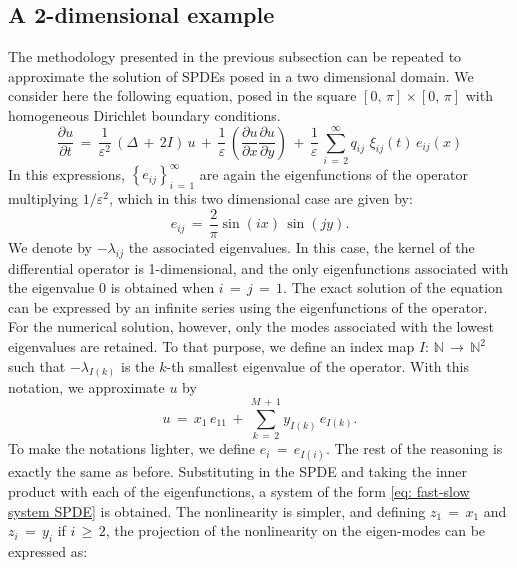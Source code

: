 \subsection{A 2-dimensional example}
\label{sub:numerical_example 2D}
The methodology presented in the previous subsection can be repeated to approximate the solution of SPDEs posed in a two dimensional domain. We consider here the following equation, posed in the square $ [ 0,\,{\pi}]{\times}[ 0,\,{\pi}]$ with homogeneous Dirichlet boundary conditions. 
\begin{equation*}
    \frac{{\partial}u}{{\partial}t} \,=\,\frac{1}{{\varepsilon}^2}\, \left( {\Delta}\,+\,2I\right)\,u \,+\, \frac{1}{\varepsilon} \, \left(\frac{{\partial}u}{{\partial}x}\frac{{\partial}u}{{\partial}y}\right) \, +\, \frac{1}{\varepsilon} \, \sum_{ i\,=\,2}^{ {\infty}}  q_{ij}\,\,{\xi}_{ij}(t)\, e_{ij}(x) 
\end{equation*}
In this expressions, $\left\{e_{ij}\right\}_{i\,=\,1}^{\infty}$ are again the eigenfunctions of the operator multiplying $1/{\varepsilon}^2$, which in this two dimensional case are given by:
\begin{equation*}
    e_{ij} \,=\, \frac{2}{\pi} \sin\left(i x\right) \, \sin\left(j y\right).
\end{equation*}
We denote by $-{\lambda}_{ ij }$ the associated eigenvalues. In this case, the kernel of the differential operator is 1-dimensional, and the only eigenfunctions associated with the eigenvalue 0 is obtained when $i\,=\,j\,=\,1$. The exact solution of the equation can be expressed by an infinite series using the eigenfunctions of the operator. For the numerical solution, however, only the modes associated with the lowest eigenvalues are retained. To that purpose, we define an index map $I: \, \mathbb N\, \to \, \mathbb N^2$ such that $-{\lambda}_{I(k)}$ is the $k$-th smallest eigenvalue of the operator. With this notation, we approximate $u$ by
\begin{equation*}
    u \,=\, x_1\,e_{11} \,+\, \sum_{ k\,=\,2}^{ M\,+\,1} y_{I(k)} \, e_{I(k)}.
\end{equation*}
To make the notations lighter, we define $e_i \,=\, e_{I(i)}$. The rest of the reasoning is exactly the same as before. Substituting in the SPDE and taking the inner product with each of the eigenfunctions, a system of the form \eqref{eq: fast-slow system SPDE} is obtained. The nonlinearity is simpler, and defining $z_1 \,=\, x_1$ and $z_i \,=\,y_i$ if $i \,{\geq}\,2$, the projection of the nonlinearity on the eigen-modes can be expressed as:

